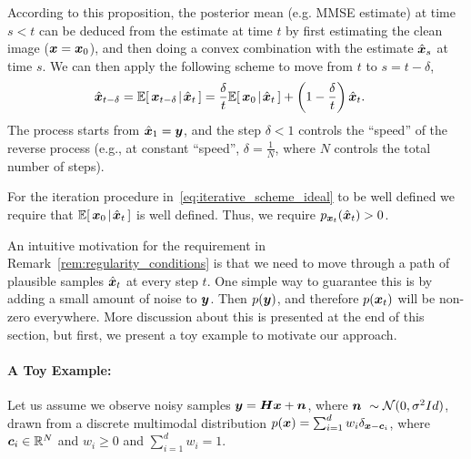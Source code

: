 \documentclass[10pt]{article} %
\begin{document}
According to this proposition, the posterior mean (e.g. MMSE estimate) at time $s<t$ can be deduced from the estimate at time $t$ by first estimating the clean image (${\bm{x}} = {\bm{x}}_0$), and then doing a convex combination with the estimate $\hat {{\bm{x}}}_s$ at time $s$. We can then apply the following scheme to move from $t$ to $s=t-\delta$, 
\begin{align}
\label{eq:iterative_scheme_ideal}
\hat{{\bm{x}}}_{t-\delta} &= \mathbb{E}[\,{\bm{x}}_{t-\delta}\!\mid\!\hat{{\bm{x}}}_t\,] = \frac{\delta}{t} \mathbb{E}[\,{\bm{x}}_0\!\mid\!\hat{{\bm{x}}}_t\,] + \left(1-\frac{\delta}{t}\right)\hat{{\bm{x}}}_t.
\end{align}
The process starts from $\hat{{\bm{x}}}_1 = {\bm{y}}$, and the step $\delta<1$ controls the ``speed'' of the reverse process (e.g., at constant ``speed'', $\delta = \frac{1}{N}$, where $N$ controls the total number of steps).

\begin{remark}
\label{rem:regularity_conditions}
For the iteration procedure in~\eqref{eq:iterative_scheme_ideal} to be well defined we require that  $\mathbb{E}[\,{\bm{x}}_0\!\mid\!\hat{{\bm{x}}}_t\,]$ is well defined. Thus, we require $p_{{\bm{x}}_t}(\hat{{\bm{x}}}_t) > 0$. 
\end{remark}
An intuitive motivation for the requirement in Remark~\ref{rem:regularity_conditions} is that we need to move through a path  of plausible samples ${\hat{{\bm{x}}}_t}$ at every step $t$. One simple way to guarantee this is by adding a small amount of noise to  ${\bm{y}}$. Then  $p({\bm{y}})$, and therefore $p({\bm{x}}_t)$ will be non-zero everywhere. More discussion about this is presented at the end of this section, but first, we present a toy example to motivate our approach.







\paragraph{A Toy Example:}
Let us assume we observe noisy samples ${\bm{y}} = {\bm{H}} {\bm{x}} + {\bm{n}}$, where ${\bm{n}}~\sim \mathcal{N}(0,\sigma^2Id)$, drawn from a discrete multimodal distribution $p({\bm{x}}) = \sum_{i=1}^d w_i \delta_{{\bm{x}}-{\bm{c}}_i}$, where ${\bm{c}}_i \in \mathbb{R}^N$ and $w_i \ge 0$ and $\sum_{i=1}^d w_i=1$. 
\end{document}
